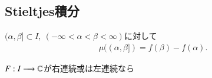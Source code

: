 \subsection{Stieltjes積分}
	\begin{screen}
		\begin{thm}[左半開区間のStiletjes測度]
			$(\alpha,\beta] \subset I,\ (-\infty < \alpha < \beta < \infty)$に対して
			\begin{align}
				\mu((\alpha,\beta]) = f(\beta) - f(\alpha).
			\end{align}
		\end{thm}
	\end{screen}
	
	\begin{screen}
		\begin{thm}
			$F:I \longrightarrow \mathbb{C}$が右連続或は左連続なら
		\end{thm}
	\end{screen}
	
	\begin{screen}
		\begin{thm}[時間変更]
			
		\end{thm}
	\end{screen}